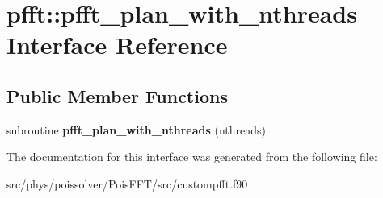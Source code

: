 \hypertarget{interfacepfft_1_1pfft__plan__with__nthreads}{}\section{pfft\+:\+:pfft\+\_\+plan\+\_\+with\+\_\+nthreads Interface Reference}
\label{interfacepfft_1_1pfft__plan__with__nthreads}
\subsection*{Public Member Functions}
\begin{DoxyCompactItemize}
\item 
subroutine {\bfseries pfft\+\_\+plan\+\_\+with\+\_\+nthreads} (nthreads)\hypertarget{interfacepfft_1_1pfft__plan__with__nthreads_aa9c50464c74a39a3beef76e3eca664cd}{}\label{interfacepfft_1_1pfft__plan__with__nthreads_aa9c50464c74a39a3beef76e3eca664cd}

\end{DoxyCompactItemize}


The documentation for this interface was generated from the following file\+:\begin{DoxyCompactItemize}
\item 
src/phys/poissolver/\+Pois\+F\+F\+T/src/custompfft.\+f90\end{DoxyCompactItemize}
